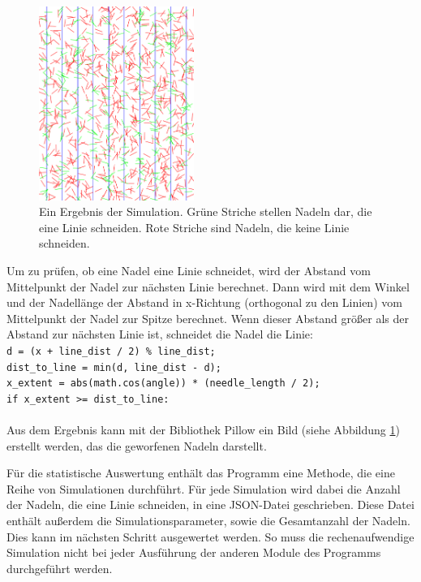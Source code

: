 \documentclass[10pt,twocolumn]{scrartcl}
\begin{document}
		\begin{figure}[htb]
			\centering
			\includegraphics[width=0.45\textwidth]{images/needels.png}
			\caption{Ein Ergebnis der Simulation. Grüne Striche stellen Nadeln dar, die eine Linie schneiden. Rote Striche sind Nadeln, die keine Linie schneiden.}
			\label{fig:needels}
		\end{figure}

		Um zu prüfen, ob eine Nadel eine Linie schneidet, wird der Abstand vom Mittelpunkt der Nadel zur nächsten Linie berechnet. Dann wird mit dem Winkel und der Nadellänge der Abstand in x-Richtung (orthogonal zu den Linien) vom Mittelpunkt der Nadel zur Spitze berechnet. Wenn dieser Abstand größer als der Abstand zur nächsten Linie ist, schneidet die Nadel die Linie:\\
		\texttt{d = (x + line\_dist / 2) \% line\_dist;\\
			dist\_to\_line = min(d, line\_dist - d);\\
			x\_extent = abs(math.cos(angle)) * (needle\_length / 2);\\
			if x\_extent >= dist\_to\_line:}\\
		\\
		Aus dem Ergebnis kann mit der Bibliothek Pillow\cite{Pillow} ein Bild (siehe Abbildung \ref{fig:needels}) erstellt werden, das die geworfenen Nadeln darstellt.

		Für die statistische Auswertung enthält das Programm eine Methode, die eine Reihe von Simulationen durchführt. Für jede Simulation wird dabei die Anzahl der Nadeln, die eine Linie schneiden, in eine JSON-Datei geschrieben. Diese Datei enthält außerdem die Simulationsparameter, sowie die Gesamtanzahl der Nadeln. Dies kann im nächsten Schritt ausgewertet werden. So muss die rechenaufwendige Simulation nicht bei jeder Ausführung der anderen Module des Programms durchgeführt werden.
\end{document}
